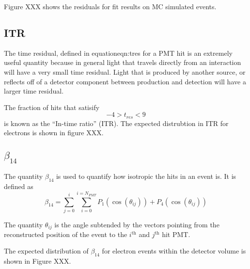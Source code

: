 Figure XXX shows the residuals for fit results on MC simulated events.


\subsection{ITR}
\label{sec:ITR}
The time residual, defined in equation{eqn:tres} for a PMT hit is an extremely useful quantity because in
general light that travels directly from an interaction will have a very small
time residual.
Light that is produced by another source, or reflects off of a detector component
between production and detection will have a larger time residual.

The fraction of hits that satisify
\begin{equation}
    -4 > t_{res} < 9 %
\end{equation}
is known as the ``In-time ratio'' (ITR).
The expected distrubtion in ITR for electrons is shown in figure XXX.

\subsection{$\beta_{14}$}
\label{sec:b14}
The quantity $\beta_{14}$ is used to quantify how isotropic the hits
in an event is. It is defined as
\begin{equation}
    \beta_{14} = \sum_{j=0}^{i}\sum_{i=0}^{i=N_{PMT}} P_{1}(\cos(\theta_{ij})) + P_{4}(\cos(\theta_{ij}))
\end{equation}

The quantity $\theta_{ij}$ is the angle subtended by the vectors pointing
from the reconstructed position of the event to the $i^{\text{th}}$ and
$j^{\text{th}}$ hit PMT.

The expected distribution of $\beta_{14}$ for electron events within the
detector volume is shown in Figure XXX.

